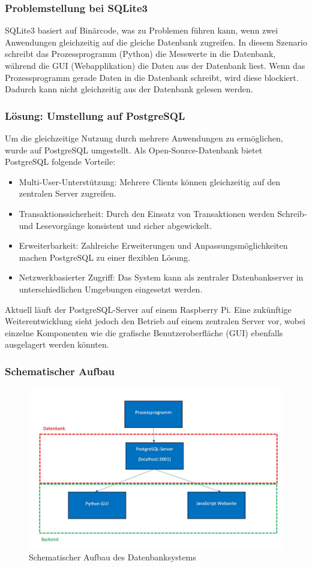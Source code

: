 \subsubsection{Problemstellung bei SQLite3}

SQLite3 basiert auf Binärcode, was zu Problemen führen kann, wenn zwei Anwendungen gleichzeitig auf die gleiche Datenbank zugreifen. In diesem Szenario schreibt das Prozessprogramm (Python) die Messwerte in die Datenbank, während die GUI (Webapplikation) die Daten aus der Datenbank liest. Wenn das Prozessprogramm gerade Daten in die Datenbank schreibt, wird diese blockiert. Dadurch kann nicht gleichzeitig aus der Datenbank gelesen werden.


\subsubsection{Lösung: Umstellung auf PostgreSQL}

Um die gleichzeitige Nutzung durch mehrere Anwendungen zu ermöglichen, wurde auf PostgreSQL umgestellt. Als Open-Source-Datenbank bietet PostgreSQL folgende Vorteile:

\begin{itemize}
    \item Multi-User-Unterstützung: Mehrere Clients können gleichzeitig auf den zentralen Server zugreifen.
    \item Transaktionssicherheit: Durch den Einsatz von Transaktionen werden Schreib- und Lesevorgänge konsistent und sicher abgewickelt.
    \item Erweiterbarkeit: Zahlreiche Erweiterungen und Anpassungsmöglichkeiten machen PostgreSQL zu einer flexiblen Lösung.
    \item Netzwerkbasierter Zugriff: Das System kann als zentraler Datenbankserver in unterschiedlichen Umgebungen eingesetzt werden.
\end{itemize}

Aktuell läuft der PostgreSQL-Server auf einem Raspberry Pi. Eine zukünftige Weiterentwicklung sieht jedoch den Betrieb auf einem zentralen Server vor, wobei einzelne Komponenten wie die grafische Benutzeroberfläche (GUI) ebenfalls ausgelagert werden könnten.


\subsubsection{Schematischer Aufbau}
\label{subsubsec:schematischer_aufbau}

\begin{figure}[h]
	\centering
	\includegraphics[width=0.4\linewidth]{figures/Schematischer Aufbau.jpeg}
	\caption[Schematischer Aufbau]{Schematischer Aufbau des Datenbanksystems}\label{fig:schematischer_aufbau}
\end{figure}


